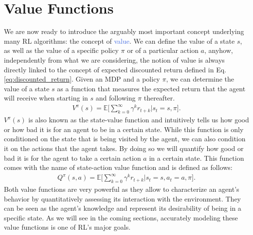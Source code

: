 \section{Value Functions}
\label{sec:value_functions}
We are now ready to introduce the arguably most important concept underlying many RL algorithms: the concept of \textcolor{RoyalBlue}{value}. We can define the value of a state $s$, as well as the value of a specific policy $\pi$ or of a particular action $a$, anyhow, independently from what we are considering, the notion of value is always directly linked to the concept of expected discounted return defined in Eq. \ref{eq:discounted_return}. Given an MDP and a policy $\pi$, we can determine the value of a state $s$ as a function that measures the expected return that the agent will receive when starting in $s$ and following $\pi$ thereafter. 
\begin{align}
    V^{\pi}(s)=\mathds{E}\bigg[\sum_{k=0}^{\infty}\gamma^{k}r_{t+k}\bigg| s_t = s, \pi \bigg].
    \label{eq:state_value_function}
\end{align}
$V^{\pi}(s)$ is also known as the state-value function and intuitively tells us how good or how bad it is for an agent to be in a certain state. While this function is only conditioned on the state that is being visited by the agent, we can also condition it on the actions that the agent takes. By doing so we will quantify how good or bad it is for the agent to take a certain action $a$ in a certain state. This function comes with the name of state-action value function and is defined as follows:
\begin{align}
     	Q^{\pi}(s,a)=\mathds{E}\bigg[\sum_{k=0}^{\infty}\gamma^{k}r_{t+k} \bigg| s_t = s, a_t=a, \pi\bigg].
\end{align}
Both value functions are very powerful as they allow to characterize an agent's behavior by quantitatively assessing its interaction with the environment. They can be seen as the agent's knowledge and represent its desirability of being in a specific state. As we will see in the coming sections, accurately modeling these value functions is one of RL's major goals.  

